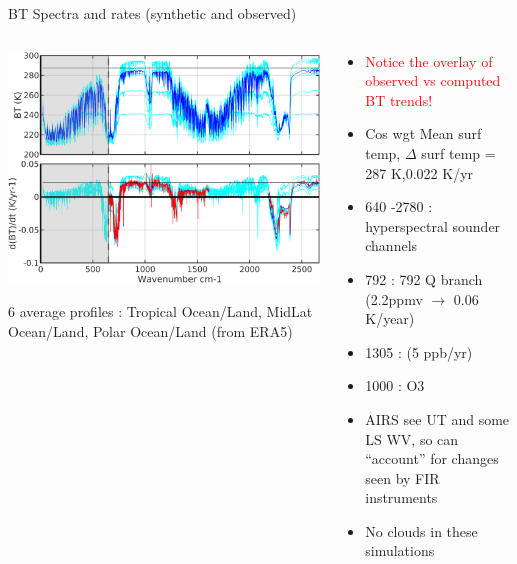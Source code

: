 \documentclass[10pt,t]{beamer}
\begin{document}

\begin{frame}{BT Spectra and rates (synthetic and observed)}

\vspace{-0.1in}
\begin{columns}

\begin{column}{0.55\columnwidth}
\begin{center}
\includegraphics[width=0.9\linewidth]{NEWFIGS/kcarta_0_3000__bttrends.png}
\end{center}
6 average profiles : Tropical Ocean/Land, MidLat Ocean/Land, Polar Ocean/Land (from ERA5)
\end{column}

\begin{column}{0.55\columnwidth}
\begin{itemize}
  \item \textcolor{red}{Notice the overlay of observed vs computed BT trends!}
  \item Cos wgt Mean surf temp, $\Delta$ surf temp = 287 K,0.022 K/yr
  \item 640 -2780 \wn : hyperspectral sounder channels
  \item 792 \wn : 792 \cd Q branch (2.2ppmv $\rightarrow$ 0.06 K/year)
  \item 1305 \wn : \methane (5 ppb/yr)
  \item 1000 \wn : O3
  \item AIRS see UT and some LS WV, so can ``account'' for changes seen by FIR instruments
  \item No clouds in these simulations
\end{itemize}
\end{column}
\end{columns}
\end{frame}
\end{document}
